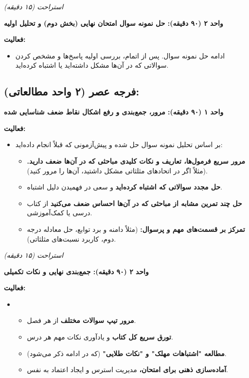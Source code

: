 \documentclass[12pt,a4paper]{article}
\newcommand{\studyunit}[1]{\par\medskip\noindent\textbf{#1}\par\nopagebreak}
\newcommand{\activities}{\par\medskip\noindent\textbf{فعالیت:}\begin{itemize}[nosep,after=\vspace{-0.5\baselineskip}]}
\newcommand{\breaktime}[1]{\par\smallskip\centerline{\textit{#1}}\smallskip}
\begin{document}
    \breaktime{استراحت (۱۵ دقیقه)}

    \studyunit{واحد ۲ (۹۰ دقیقه): حل نمونه سوال امتحان نهایی (بخش دوم) و تحلیل اولیه}
        \activities
            \item ادامه حل نمونه سوال. پس از اتمام، بررسی اولیه پاسخ‌ها و مشخص کردن سوالاتی که در آن‌ها مشکل داشته‌اید یا اشتباه کرده‌اید.
        \end{itemize}

\subsection*{فرجه عصر (۲ واحد مطالعاتی):}
    \studyunit{واحد ۱ (۹۰ دقیقه): مرور، جمع‌بندی و رفع اشکال نقاط ضعف شناسایی شده}
        \activities
            \item بر اساس تحلیل نمونه سوال حل شده و پیش‌آزمونی که قبلاً انجام داده‌اید:
            \begin{itemize}[nosep, labelindent=1em]
                \item \textbf{مرور سریع فرمول‌ها، تعاریف و نکات کلیدی مباحثی که در آن‌ها ضعف دارید.} (مثلاً اگر در اتحادهای مثلثاتی مشکل داشتید، آن‌ها را مرور کنید).
                \item \textbf{حل مجدد سوالاتی که اشتباه کرده‌اید} و سعی در فهمیدن دلیل اشتباه.
                \item \textbf{حل چند تمرین مشابه از مباحثی که در آن‌ها احساس ضعف می‌کنید} از کتاب درسی یا کمک‌آموزشی.
                \item \textbf{تمرکز بر قسمت‌های مهم و پرسوال:} (مثلاً دامنه و برد توابع، حل معادله درجه دوم، کاربرد نسبت‌های مثلثاتی).
            \end{itemize}
        \end{itemize}

    \breaktime{استراحت (۱۵ دقیقه)}

    \studyunit{واحد ۲ (۹۰ دقیقه): جمع‌بندی نهایی و نکات تکمیلی}
        \activities
            \item %
            \begin{itemize}[nosep, labelindent=1em]
                \item \textbf{مرور تیپ سوالات مختلف} از هر فصل.
                \item \textbf{تورق سریع کل کتاب} و یادآوری نکات مهم هر درس.
                \item \textbf{مطالعه "اشتباهات مهلک" و "نکات طلایی"} (که در ادامه ذکر می‌شود).
                \item \textbf{آماده‌سازی ذهنی برای امتحان،} مدیریت استرس و ایجاد اعتماد به نفس.
            \end{itemize}
        \end{itemize}
\end{document}
